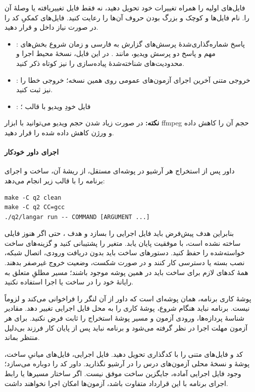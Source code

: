 فایل‌های اولیه را همراه تغییرات خود تحویل دهید، نه فقط فایل تغییر‌یافته
یا وصلهٔ آن را. نام فایل‌ها و کوچک و بزرگ بودن حروف آن‌ها را رعایت
کنید. فایل‌های کمکیِ کد را در صورت نیاز داخل
 و  قرار دهید.

\begin{itemize}
  \item {}: پاسخ شماره‌گذاری‌شدهٔ پرسش‌های گزارش
  به فارسی و زمان شروع بخش‌های مهم و پاسخ دو پرسش ویدیو، مانند
  . در این فایل، نسخهٔ محیط اجرا و محدودیت‌های
  شناخته‌شدهٔ پیاده‌سازی را نیز کوتاه ذکر کنید.
  \item {}: خروجی متنی آخرین اجرای
  آزمون‌های عمومی روی همین نسخه؛ خروجی خطا را نیز ثبت کنید.
  \item {}: فایل خودِ ویدیو با قالب
  ؛
\end{itemize}

\textbf{نکته:} در صورت زیاد شدن حجم ویدیو می‌توانید با ابزار ffmpeg حجم آن را کاهش داده و ورژن کاهش داده شده را قرار دهید.

\paragraph{ اجرای داور خودکار}
داور پس از استخراج هر آرشیو در پوشه‌ای مستقل، از ریشهٔ آن، ساخت و
اجرای برنامه را با قالب زیر انجام می‌دهد:

\begin{latin}
\begin{verbatim}
make -C q2 clean
make -C q2 CC=gcc
./q2/langar run -- COMMAND [ARGUMENT ...]
\end{verbatim}
\end{latin}

بنابراین هدف پیش‌فرض  باید فایل اجرایی
 را بسازد و هدف ، حتی
اگر هنوز فایلی ساخته نشده است، با موفقیت پایان یابد. متغیر
 را پشتیبانی کنید و گزینه‌های ساخت خواسته‌شده را
حفظ کنید. دستورهای ساخت باید بدون دریافت ورودی، اتصال شبکه، نصب بسته
یا دسترسی  کار کنند و در صورت شکست، وضعیت خروج غیرصفر بدهند.
همهٔ کدهای لازم برای ساخت باید در همین پوشه موجود باشند؛ مسیر مطلقِ
متعلق به رایانهٔ خود را در ساخت یا اجرا استفاده نکنید.

پوشهٔ کاری برنامه، همان پوشه‌ای است که داور از آن لنگر را فراخوانی
می‌کند و لزوماً  نیست. برنامه نباید هنگام شروع،
پوشهٔ کاری را به محل فایل اجرایی تغییر دهد. مقادیر شناسهٔ پردازه‌ها،
ورودی آزمون و مسیر پوشهٔ استخراج را ثابت فرض نکنید. برای هر آزمون
مهلت اجرا در نظر گرفته می‌شود و برنامه نباید پس از پایان کار فرزند
بی‌دلیل منتظر بماند.

کد و فایل‌های متنی را با کدگذاری  تحویل دهید. فایل اجرایی،
فایل‌های میانیِ ساخت، پوشهٔ  و نسخهٔ محلی آزمون‌های
درس را در آرشیو نگذارید. داور کد را دوباره می‌سازد؛ وجود فایل اجرایی
آماده، جایگزین ساخت موفق نیست. اگر ساختار مسیرها یا رابط اجرای برنامه
با این قرارداد متفاوت باشد، آزمون‌ها امکان اجرا نخواهند داشت.
